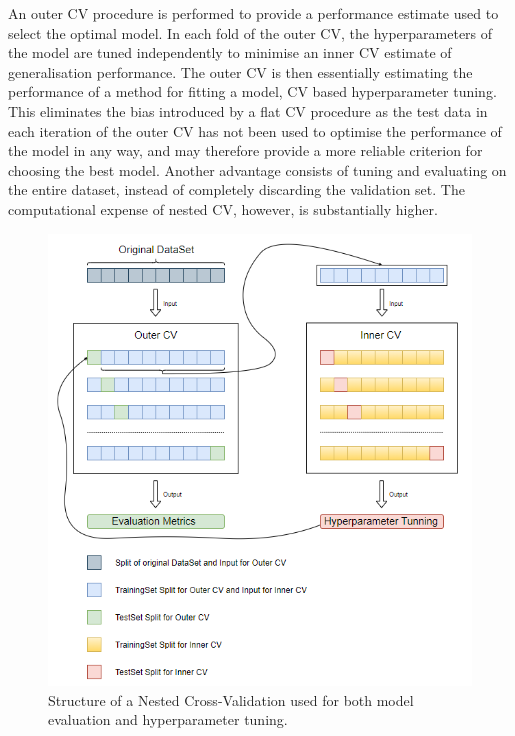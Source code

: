 An outer CV procedure is performed to provide a performance estimate used to select the optimal model. In each fold of the outer CV, the hyperparameters of the model are tuned independently to minimise an inner CV estimate of generalisation performance. The outer CV is then essentially estimating the performance of a method for fitting a model, CV based hyperparameter tuning. This eliminates the bias introduced by a flat CV procedure as the test data in each iteration of the outer CV has not been used to optimise the performance of the model in any way, and may therefore provide a more reliable criterion for choosing the best model. Another advantage consists of tuning and evaluating on the entire dataset, instead of completely discarding the validation set. The computational expense of nested CV, however, is substantially higher. \\



\begin{figure}[H]
  \centering
  \includegraphics[scale=0.95]{Images/nested_cv.png}
  \caption{Structure of a Nested Cross-Validation used for both model evaluation and hyperparameter tuning.}
  \label{NestedCV}
\end{figure}


